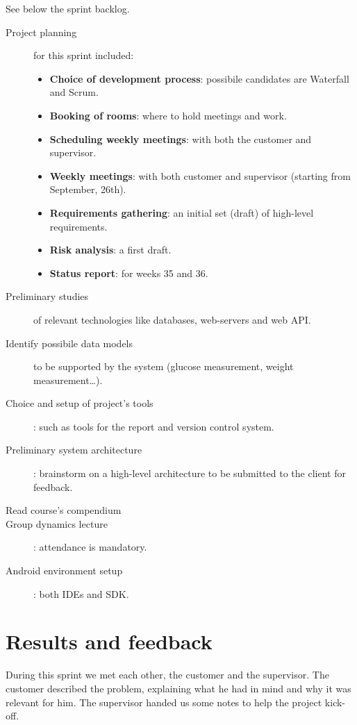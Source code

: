 See below the sprint backlog.
\begin{description}
	\item[Project planning]
		for this sprint included:
		\begin{itemize}
			\item \textbf{Choice of development process}:
				possibile candidates are Waterfall and Scrum.
			\item \textbf{Booking of rooms}:
				where to hold meetings and work.
			\item \textbf{Scheduling weekly meetings}:
				with both the customer and supervisor.
			\item \textbf{Weekly meetings}:
				with both customer and supervisor (starting from September, 26th).
			\item \textbf{Requirements gathering}:
				an initial set (draft) of high-level requirements.
			\item \textbf{Risk analysis}:
				a first draft.
			\item \textbf{Status report}:
				for weeks 35 and 36.
		\end{itemize}
	\item[Preliminary studies]
		of relevant technologies like databases, web-servers and web API.
	\item[Identify possibile data models]
		to be supported by the system (glucose measurement, weight measurement\ldots).
	\item[Choice and setup of project's tools]:
		such as tools for the report and version control system.
	\item[Preliminary system architecture]:
		brainstorm on a high-level architecture to be submitted to the client for feedback.
	\item[Read course's compendium]
	\item[Group dynamics lecture]:
		attendance is mandatory.
	\item[Android environment setup]:
		both IDEs and SDK.
\end{description}


\section{Results and feedback}

During this sprint we met each other, the customer and the supervisor.
The customer described the problem, explaining what he had in mind and why it was relevant for him.
The supervisor handed us some notes to help the project kick-off.

